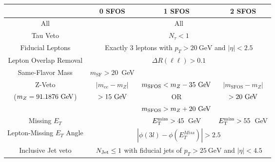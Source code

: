 \begin{tabular}{|c||c||c||c|}
\hline
&  0 SFOS  	& 1 SFOS		  & 2 SFOS  \\
\hline 
\hline 
All & \multicolumn{3}{c|}{All} \\
\hline 
Tau Veto & \multicolumn{3}{c|}{$N_{\tau} < 1$} \\
\hline 
Fiducial Leptons & \multicolumn{3}{c|}{Exactly 3 leptons with $p_{T} > 20~\mathrm{GeV}$ and $|\eta|<2.5$} \\
\hline 
Lepton Overlap Removal & \multicolumn{3}{c|}{$\Delta R(\ell \ell) > 0.1$}\\
\hline 
Same-Flavor Mass &	$m_{\textrm{SF}} > 20$~GeV	& \multicolumn{2}{c|}{} \\
\hline 
Z-Veto                &  $|m_{ee}-m_Z|$ & $m_{\textrm{SFOS}} < m_{Z}-35\GeV$ & $|m_{\textrm{SFOS}}-m_Z|$ \\
($m_Z = 91.1876\GeV$)  &  $>15\GeV$                                         & OR   &  $>20\GeV$\\
                      & 					  & $m_{\textrm{SFOS}}>m_{Z}+20\GeV$	   &  \\
\hline 
Missing $E_{T}$		& 		& $E_{\mathrm{T}}^{\mathrm{miss}} > 45$~GeV & $E_{\mathrm{T}}^{\mathrm{miss}} > 55$~GeV \\
\hline 
Lepton-Missing $E_{T}$ Angle 	& 	\multicolumn{3}{c|}{$|\phi(3l)-\phi(E_{T}^{Miss})| > 2.5$} \\
\hline 
Inclusive Jet veto	& \multicolumn{3}{c|}{$N_{\textrm{Jet}} \leq 1$ with fiducial jets of $p_{T} > 25~\mathrm{GeV}$ and $|\eta| < 4.5$ } \\
\hline 
\end{tabular}
